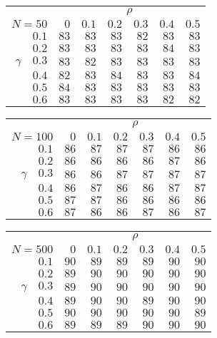 \begin{tabular}{r|rrrrrr}
\hline\hline
 &\multicolumn{6}{c}{$\rho$} \\ 
 $N = 50$ & $0$ & $0.1$ & $0.2$ & $0.3$ & $0.4$ & $0.5$ \\ 
 \hline$0.1$ & $83$ & $83$ & $83$ & $82$ & $83$ & $83$\\ 
$0.2$ & $83$ & $83$ & $83$ & $83$ & $84$ & $83$\\ 
$\gamma\quad$$0.3$ & $83$ & $82$ & $83$ & $83$ & $83$ & $83$\\ 
$0.4$ & $82$ & $83$ & $84$ & $83$ & $83$ & $84$\\ 
$0.5$ & $84$ & $83$ & $83$ & $83$ & $83$ & $83$\\ 
$0.6$ & $83$ & $83$ & $83$ & $83$ & $82$ & $82$\\ 
 \hline 
 \end{tabular}
 
 \vspace{2em} 
 
\begin{tabular}{r|rrrrrr}
\hline\hline
 &\multicolumn{6}{c}{$\rho$} \\ 
 $N = 100$ & $0$ & $0.1$ & $0.2$ & $0.3$ & $0.4$ & $0.5$ \\ 
 \hline$0.1$ & $86$ & $87$ & $87$ & $87$ & $86$ & $86$\\ 
$0.2$ & $86$ & $86$ & $86$ & $86$ & $87$ & $86$\\ 
$\gamma\quad$$0.3$ & $86$ & $86$ & $87$ & $87$ & $87$ & $87$\\ 
$0.4$ & $86$ & $87$ & $86$ & $86$ & $87$ & $87$\\ 
$0.5$ & $87$ & $87$ & $86$ & $86$ & $86$ & $86$\\ 
$0.6$ & $87$ & $86$ & $86$ & $87$ & $86$ & $87$\\ 
 \hline 
 \end{tabular}
 
 \vspace{2em} 
 
\begin{tabular}{r|rrrrrr}
\hline\hline
 &\multicolumn{6}{c}{$\rho$} \\ 
 $N = 500$ & $0$ & $0.1$ & $0.2$ & $0.3$ & $0.4$ & $0.5$ \\ 
 \hline$0.1$ & $90$ & $89$ & $89$ & $89$ & $90$ & $90$\\ 
$0.2$ & $89$ & $90$ & $90$ & $90$ & $90$ & $90$\\ 
$\gamma\quad$$0.3$ & $89$ & $90$ & $90$ & $90$ & $90$ & $90$\\ 
$0.4$ & $89$ & $90$ & $90$ & $89$ & $90$ & $90$\\ 
$0.5$ & $90$ & $90$ & $90$ & $90$ & $90$ & $89$\\ 
$0.6$ & $89$ & $89$ & $89$ & $90$ & $90$ & $90$\\ 
 \hline 
 \end{tabular}